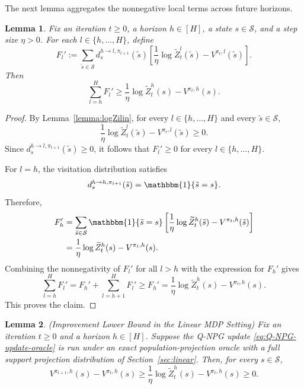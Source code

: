 \documentclass[11pt]{article}
\newtheorem{lem}{Lemma}
\begin{document}
The next lemma aggregates the nonnegative local terms across future horizons.

\begin{lem}\label{lem:Llin}
Fix an iteration $t\ge0$, a horizon $h\in[H]$, a state $s\in\mathcal S$, and a step size
$\eta>0$. For each $l\in\{h,\ldots,H\}$, define
\[
F_l'
:=
\sum_{\tilde s\in\mathcal S}
d_s^{h\to l,\pi_{t+1}}(\tilde s)
\left[
\frac{1}{\eta}\log \widetilde Z_t^l(\tilde s)
-
V^{\pi_t,l}(\tilde s)
\right].
\]
Then
\[
\sum_{l=h}^H F_l'
\ge
\frac{1}{\eta}\log \widetilde Z_t^h(s)-V^{\pi_t,h}(s).
\]
\end{lem}

\begin{proof}
By Lemma~\ref{lemma:logZilin}, for every $l\in\{h,\ldots,H\}$ and every
$\tilde s\in\mathcal S$,
\[
\frac{1}{\eta}\log \widetilde Z_t^l(\tilde s)
-
V^{\pi_t,l}(\tilde s)
\ge0.
\]
Since $d_s^{h\to l,\pi_{t+1}}(\tilde s)\ge0$, it follows that $F_l'\ge0$ for every
$l\in\{h,\ldots,H\}$.

For $l=h$, the visitation distribution satisfies
\[
d_s^{h\to h,\pi_{t+1}}(\tilde s)
=
\mathbbm{1}\{\tilde s=s\}.
\]
Therefore,
\begin{align*}
F_h'
&=
\sum_{\tilde s\in\mathcal S}
\mathbbm{1}\{\tilde s=s\}
\left[
\frac{1}{\eta}\log \widetilde Z_t^h(\tilde s)
-
V^{\pi_t,h}(\tilde s)
\right] \\
&=
\frac{1}{\eta}\log \widetilde Z_t^h(s)-V^{\pi_t,h}(s).
\end{align*}
Combining the nonnegativity of $F_l'$ for all $l>h$ with the expression for $F_h'$ gives
\[
\sum_{l=h}^H F_l'
=
F_h'+\sum_{l=h+1}^H F_l'
\ge
F_h'
=
\frac{1}{\eta}\log \widetilde Z_t^h(s)-V^{\pi_t,h}(s).
\]
This proves the claim.
\end{proof}

\begin{lem}\label{lem:ILB_linear_oracle}
(Improvement Lower Bound in the Linear MDP Setting)
Fix an iteration $t\ge0$ and a horizon $h\in[H]$. Suppose the Q-NPG update
\eqref{eq:Q-NPG-update-oracle} is run under an exact population-projection oracle with a full support projection distribution
of Section~\ref{sec:linear}. Then, for every $s\in\mathcal S$,
\[
V^{\pi_{t+1},h}(s)-V^{\pi_t,h}(s)
\ge
\frac{1}{\eta}\log \widetilde Z_t^h(s)-V^{\pi_t,h}(s)
\ge0.
\]
\end{lem}
\end{document}
